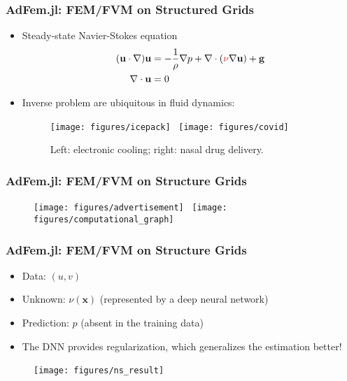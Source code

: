 \documentclass[usenames,dvipsnames]{beamer}
\begin{document}
\begin{frame}
	\frametitle{AdFem.jl: FEM/FVM on Structured Grids}
	\begin{itemize}
		\item Steady-state Navier-Stokes equation
		\begin{equation*}
	\begin{aligned}
		(\mathbf{u} \cdot \nabla) \mathbf{u} &=
    -\frac{1}{\rho} \nabla p + \nabla\cdot (\textcolor{red}{\nu} \nabla \mathbf{u}) + \mathbf{g}\\
\nabla \cdot \mathbf{u} &= 0
	\end{aligned}
    \end{equation*}
    
    \item Inverse problem are ubiquitous in fluid dynamics:
    
    \begin{figure}[hbt]
    \centering
  \texttt{[image: figures/icepack]}~
  \texttt{[image: figures/covid]}
  \caption{Left: electronic cooling; right: nasal drug delivery.}
\end{figure}

	\end{itemize}
	    
  \end{frame}
  
  
  \begin{frame}
  	\frametitle{AdFem.jl: FEM/FVM on Structure Grids}
  	
  	\begin{figure}[hbt]
    \centering
  \texttt{[image: figures/advertisement]}~
  \texttt{[image: figures/computational\_graph]}
\end{figure}
  \end{frame}

  
  
  \begin{frame}
  	\frametitle{AdFem.jl: FEM/FVM on Structure Grids}
\begin{itemize}
	\item Data: $(u, v)$
	\item Unknown: $\nu(\mathbf{x})$ (represented by a deep neural network)
	\item Prediction: $p$ (absent in the training data) 
	\item The DNN provides regularization, which generalizes the estimation better!
	\end{itemize}
  	\begin{figure}[hbt]
    \centering
  \texttt{[image: figures/ns\_result]}~
\end{figure}
  \end{frame}
\end{document}
